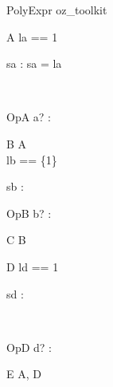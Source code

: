 \begin{zsection}
  \SECTION PolyExpr \parents oz\_toolkit
\end{zsection}

\begin{class}{A}
  la == 1\\
  \begin{state}
    sa : \nat
  \where
    sa = la
  \end{state}\\
  \begin{op}{OpA}
    a? : \nat
  \end{op}
\end{class}

\begin{class}{B}
  A\\
  lb == \{1\}\\
  \begin{state}
    sb : \power \nat
  \end{state}
  \begin{op}{OpB}
    b? : \power \nat
  \end{op}
\end{class}

\begin{class}{C}
  B
\end{class}

\begin{class}{D}
  ld == 1\\
  \begin{state}
    sd : \nat
  \end{state}\\
  \begin{op}{OpD}
    d? : \nat
  \end{op}
\end{class}

\begin{class}{E}
 A, D
\end{class}

